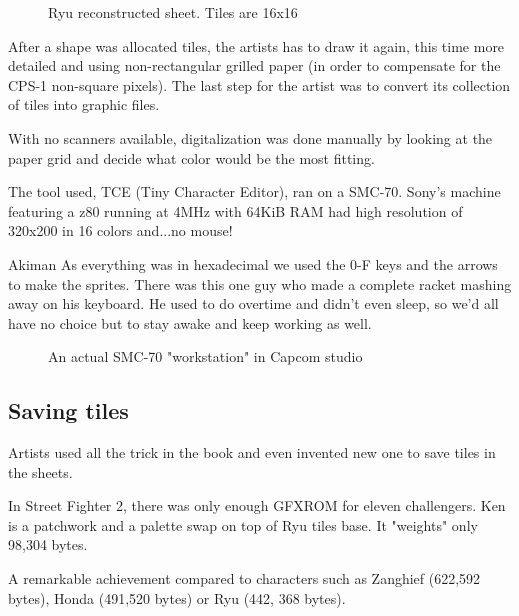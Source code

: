  \begin{figure}[H]
\caption*{Ryu reconstructed sheet. Tiles are 16x16}
\end{figure}


After a shape was allocated tiles, the artists has to draw it again, this time more detailed and using non-rectangular grilled paper (in order to compensate for the CPS-1 non-square pixels). The last step for the artist was to convert its collection of tiles into graphic files. 

With no scanners available, digitalization was done manually by looking at the paper grid and decide what color would be the most fitting.




The tool used, TCE (Tiny Character Editor), ran on a SMC-70. Sony's machine featuring a z80 running at 4MHz with 64KiB RAM had high resolution of 320x200 in 16 colors and...no mouse!

\begin{q}{Akiman\cite{ar20160404}}
  As everything was in hexadecimal we used the 0-F keys and the arrows to make the sprites. There was this one guy who made a complete racket mashing away on his keyboard. He used to do overtime and didn't even sleep, so we'd all have no choice but to stay awake and keep working as well.
\end{q}

 \begin{figure}[H]
\caption*{An actual SMC-70 "workstation" in Capcom studio}
\end{figure}









\subsection{Saving tiles}
Artists used all the trick in the book and even invented new one to save tiles in the sheets. 

In Street Fighter 2, there was only enough GFXROM for eleven challengers. Ken is a patchwork and a palette swap on top of Ryu tiles base. It "weights" only 98,304 bytes. 

A remarkable achievement compared to characters such as Zanghief (622,592 bytes), Honda (491,520 bytes) or Ryu (442, 368 bytes). 

